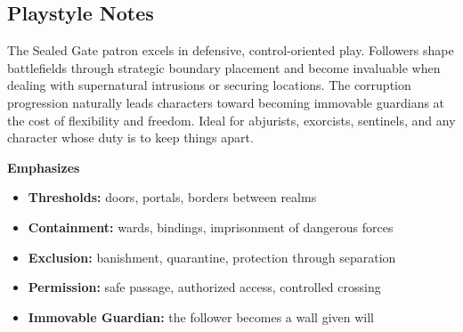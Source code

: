 \subsection*{Playstyle Notes}
The Sealed Gate patron excels in defensive, control-oriented play. Followers shape battlefields through strategic boundary placement and become invaluable when dealing with supernatural intrusions or securing locations. The corruption progression naturally leads characters toward becoming immovable guardians at the cost of flexibility and freedom. Ideal for abjurists, exorcists, sentinels, and any character whose duty is to keep things apart.

\noindent\textbf{Emphasizes}
\begin{itemize}
  \item \textbf{Thresholds:} doors, portals, borders between realms
  \item \textbf{Containment:} wards, bindings, imprisonment of dangerous forces
  \item \textbf{Exclusion:} banishment, quarantine, protection through separation
  \item \textbf{Permission:} safe passage, authorized access, controlled crossing
  \item \textbf{Immovable Guardian:} the follower becomes a wall given will
\end{itemize}

